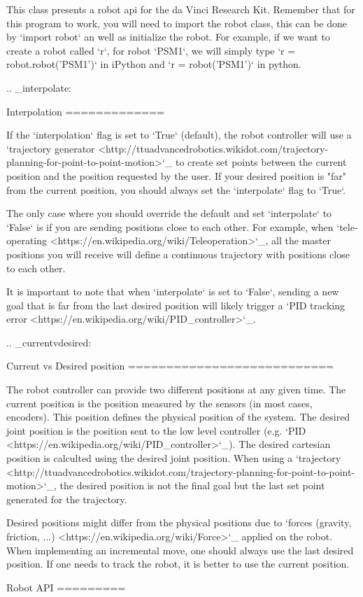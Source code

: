 \begin{DoxyVerb}This class presents a robot api for the da Vinci Research Kit.
Remember that for this program to work, you will need to import the
robot class, this can be done by `import robot` an well as initialize
the robot. For example, if we want to create a robot called `r`, for
robot `PSM1`, we will simply type `r = robot.robot('PSM1')` in iPython
and `r = robot('PSM1')` in python.

.. _interpolate:

Interpolation
=============

If the `interpolation` flag is set to `True` (default), the robot
controller will use a `trajectory generator
<http://ttuadvancedrobotics.wikidot.com/trajectory-planning-for-point-to-point-motion>`_
to create set points between the current position and the position
requested by the user.  If your desired position is "far" from the
current position, you should always set the `interpolate` flag to
`True`.

The only case where you should override the default and set
`interpolate` to `False` is if you are sending positions close to each
other.  For example, when `tele-operating
<https://en.wikipedia.org/wiki/Teleoperation>`_, all the master
positions you will receive will define a continuous trajectory with
positions close to each other.

It is important to note that when `interpolate` is set to `False`,
sending a new goal that is far from the last desired position will
likely trigger a `PID tracking error <https://en.wikipedia.org/wiki/PID_controller>`_.

.. _currentvdesired:

Current vs Desired position
===========================

The robot controller can provide two different positions at any given
time.  The current position is the position measured by the sensors
(in most cases, encoders).  This position defines the physical
position of the system.  The desired joint position is the position
sent to the low level controller (e.g. `PID
<https://en.wikipedia.org/wiki/PID_controller>`_).  The desired
cartesian position is calculted using the desired joint position.
When using a `trajectory
<http://ttuadvancedrobotics.wikidot.com/trajectory-planning-for-point-to-point-motion>`_,
the desired position is not the final goal but the last set point
generated for the trajectory.

Desired positions might differ from the physical positions due to
`forces (gravity, friction, ...) <https://en.wikipedia.org/wiki/Force>`_ applied on the robot.  When
implementing an incremental move, one should always use the last
desired position.  If one needs to track the robot, it is better to
use the current position.

Robot API
=========\end{DoxyVerb}
 